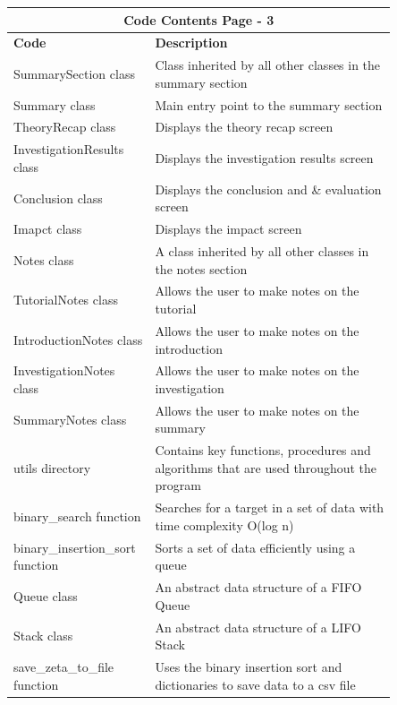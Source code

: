 \documentclass[12pt]{article}
\begin{document}
\begin{table}[ht]
    \centering
    \begin{tabular}{|p{0.26\linewidth}|p{0.59\linewidth}|}
    \hline
    \multicolumn{2}{|c|}{\textbf{Code Contents Page - 3}}\\
    \hline
    \hline
    \textbf{Code} & \textbf{Description}\\
    \hline
    SummarySection class & Class inherited by all other classes in the summary section\\
    \hline
    Summary class & Main entry point to the summary section\\
    \hline
    TheoryRecap class & Displays the theory recap screen\\
    \hline
    InvestigationResults class & Displays the investigation results screen\\
    \hline
    Conclusion class & Displays the conclusion and \& evaluation screen\\
    \hline
    Imapct class & Displays the impact screen\\
    \hline
    Notes class & A class inherited by all other classes in the notes section\\
    \hline
    TutorialNotes class & Allows the user to make notes on the tutorial\\
    \hline
    IntroductionNotes class & Allows the user to make notes on the introduction\\
    \hline
    InvestigationNotes class & Allows the user to make notes on the investigation\\
    \hline
    SummaryNotes class & Allows the user to make notes on the summary\\
    \hline
    utils directory & Contains key functions, procedures and algorithms that are used throughout the program\\
    \hline
    binary\_search function & Searches for a target in a set of data with time complexity O(log n)\\
    \hline
    binary\_insertion\_sort function & Sorts a set of data efficiently using a queue\\
    \hline
    Queue class & An abstract data structure of a FIFO Queue\\
    \hline
    Stack class & An abstract data structure of a LIFO Stack\\
    \hline
    save\_zeta\_to\_file \phantom{text} function & Uses the binary insertion sort and dictionaries to save data to a csv file\\

\end{tabular}
\end{table}
\end{document}
